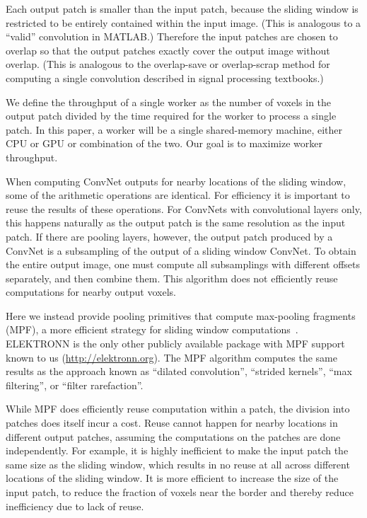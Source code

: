 \documentclass[conference]{./IEEEtran/IEEEtran}
\begin{document}
  Each output patch is smaller than the input patch, because the
  sliding window is restricted to be entirely contained within the
  input image.  (This is analogous to a ``valid'' convolution in
  MATLAB.)  Therefore the input patches are chosen to overlap so that
  the output patches exactly cover the output image without
  overlap. (This is analogous to the overlap-save or overlap-scrap
  method for computing a single convolution described in signal
  processing textbooks.)

  We define the throughput of a single worker as the number of voxels
  in the output patch divided by the time required for the worker to
  process a single patch.  In this paper, a worker will be a single
  shared-memory machine, either CPU or GPU or combination of the two.
  Our goal is to maximize worker throughput.

  When computing ConvNet outputs for nearby locations of the sliding
  window, some of the arithmetic operations are identical.  For
  efficiency it is important to reuse the results of these operations.
  For ConvNets with convolutional layers only, this happens naturally
  as the output patch is the same resolution as the input patch.  If
  there are pooling layers, however, the output patch produced by a
  ConvNet is a subsampling of the output of a sliding window ConvNet.
  To obtain the entire output image, one must compute all subsamplings
  with different offsets separately, and then combine them.  This
  algorithm does not efficiently reuse computations for nearby output
  voxels.

  Here we instead provide pooling primitives that compute max-pooling
  fragments (MPF), a more efficient strategy for sliding window
  computations~\cite{giusti2013fast, masci2013fast}.  ELEKTRONN is the
  only other publicly available package with MPF support known to us
  (\url{http://elektronn.org}).  The MPF algorithm computes the same
  results as the approach known as ``dilated
  convolution''\cite{yu2015multi}, ``strided
  kernels''\cite{tschopp2015efficient}, ``max
  filtering''\cite{zlateski2015znn}, or ``filter
  rarefaction''\cite{long2015fully}.

  While MPF does efficiently reuse computation within a patch, the
  division into patches does itself incur a cost. Reuse cannot happen
  for nearby locations in different output patches, assuming the
  computations on the patches are done independently.  For example, it
  is highly inefficient to make the input patch the same size as the
  sliding window, which results in no reuse at all across different
  locations of the sliding window.  It is more efficient to increase
  the size of the input patch, to reduce the fraction of voxels near
  the border and thereby reduce inefficiency due to lack of reuse.
\end{document}
